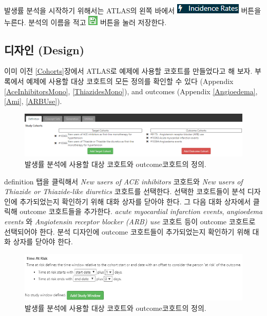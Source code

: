 \documentclass[11pt]{book}
\theoremstyle{definition}
\theoremstyle{definition}
\theoremstyle{definition}
\theoremstyle{remark}
\begin{document}
발생률 분석을 시작하기 위해서는 ATLAS의 왼쪽 바에서
\includegraphics{images/Characterization/atlasIncidenceMenuItem.png}
버튼을 누른다. 분석의 이름을 적고
\includegraphics{images/PopulationLevelEstimation/save.png} 버튼을 눌러
저장한다.

\subsection{디자인 (Design)}\label{-design-2}

이미 이전 \ref{Cohorts}장에서 ATLAS로 예제에 사용할 코호트를 만들었다고
해 보자. 부록에서 예제에 사용할 대상 코호트의 모든 정의를 확인할 수 있다
(Appendix \ref{AceInhibitorsMono}, \ref{ThiazidesMono}), and outcomes
(Appendix \ref{Angioedema}, \ref{Ami}, \ref{ARBUse}).

\begin{figure}

{\centering \includegraphics[width=1\linewidth]{images/Characterization/atlasIncidenceCohortSelection} 

}

\caption{발생률 분석에 사용할 대상 코호트와 outcome코호트의 정의.}\label{fig:atlasIncidenceCohortSelection}
\end{figure}

definition 탭을 클릭해서 \emph{New users of ACE inhibitors} 코호트와
\emph{New users of Thiazide or Thiazide-like diuretics} 코호트를
선택한다. 선택한 코호트들이 분석 디자인에 추가되었는지 확인하기 위해
대화 상자를 닫아야 한다. 그 다음 대화 상자에서 클릭해 outcome 코호트들을
추가한다. \emph{acute myocardial infarction events}, \emph{angioedema
events} 와 \emph{Angiotensin receptor blocker (ARB) use} 코호트 등이
outcome 코호트로 선택되어야 한다. 분석 디자인에 outcome 코호트들이
추가되었는지 확인하기 위해 대화 상자를 닫아야 한다.

\begin{figure}

{\centering \includegraphics[width=1\linewidth]{images/Characterization/atlasIncidenceTimeAtRisk} 

}

\caption{발생률 분석에 사용할 대상 코호트와 outcome코호트의 정의.}\label{fig:atlasIncidenceTimeAtRisk}
\end{figure}
\end{document}
